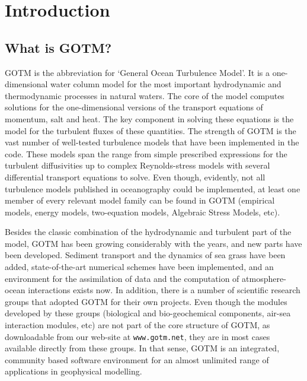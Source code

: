 %
%

\section{Introduction}

\subsection{What is GOTM?}
GOTM is the abbreviation for `General Ocean Turbulence Model'. It is a
one-dimensional water column model for the most important hydrodynamic
and thermodynamic processes in natural waters. The core of the model
computes solutions for the one-dimensional versions of the transport
equations of momentum, salt and heat. The key component in solving
these equations is the model for the turbulent fluxes of these
quantities. The strength of GOTM is the vast number of well-tested
turbulence models that have been implemented in the code. These models
span the range from simple prescribed expressions for the turbulent
diffusivities up to complex Reynolds-stress models with several
differential transport equations to solve. Even though, evidently, not
all turbulence models published in oceanography could be implemented,
at least one member of every relevant model family can be found in
GOTM (empirical models, energy models, two-equation models, Algebraic
Stress Models, etc).

Besides the classic combination of the hydrodynamic and turbulent part
of the model, GOTM has been growing considerably with the years, and
new parts have been developed. Sediment transport and the dynamics of
sea grass have been added, state-of-the-art numerical schemes have
been implemented, and an environment for the assimilation of data and
the computation of atmosphere-ocean interactions exists now. In
addition, there is a number of scientific research groups that adopted
GOTM for their own projects. Even though the modules developed by
these groups (biological and bio-geochemical components, air-sea
interaction modules, etc) are not part of the core structure of GOTM,
as downloadable from our web-site at {\tt www.gotm.net}, 
they are in most cases available
directly from these groups. In that sense, GOTM is an integrated,
community based software environment for an almost unlimited range of
applications in geophysical modelling.



